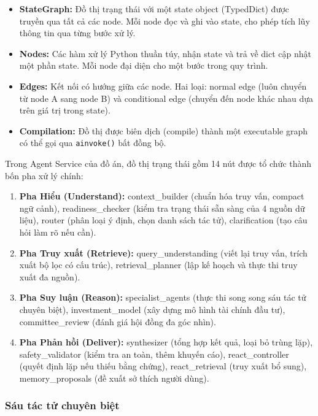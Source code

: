 \begin{itemize}
    \item \textbf{StateGraph:} Đồ thị trạng thái với một state object (TypedDict) được truyền qua tất cả các node. Mỗi node đọc và ghi vào state, cho phép tích lũy thông tin qua từng bước xử lý.
    \item \textbf{Nodes:} Các hàm xử lý Python thuần túy, nhận state và trả về dict cập nhật một phần state. Mỗi node đại diện cho một bước trong quy trình.
    \item \textbf{Edges:} Kết nối có hướng giữa các node. Hai loại: normal edge (luôn chuyển từ node A sang node B) và conditional edge (chuyển đến node khác nhau dựa trên giá trị trong state).
    \item \textbf{Compilation:} Đồ thị được biên dịch (compile) thành một executable graph có thể gọi qua \texttt{ainvoke()} bất đồng bộ.
\end{itemize}

Trong Agent Service của đồ án, đồ thị trạng thái gồm 14 nút được tổ chức thành bốn pha xử lý chính:

\begin{enumerate}
    \item \textbf{Pha Hiểu (Understand):} context\_builder (chuẩn hóa truy vấn, compact ngữ cảnh), readiness\_checker (kiểm tra trạng thái sẵn sàng của 4 nguồn dữ liệu), router (phân loại ý định, chọn danh sách tác tử), clarification (tạo câu hỏi làm rõ nếu cần).

    \item \textbf{Pha Truy xuất (Retrieve):} query\_understanding (viết lại truy vấn, trích xuất bộ lọc có cấu trúc), retrieval\_planner (lập kế hoạch và thực thi truy xuất đa nguồn).

    \item \textbf{Pha Suy luận (Reason):} specialist\_agents (thực thi song song sáu tác tử chuyên biệt), investment\_model (xây dựng mô hình tài chính đầu tư), committee\_review (đánh giá hội đồng đa góc nhìn).

    \item \textbf{Pha Phản hồi (Deliver):} synthesizer (tổng hợp kết quả, loại bỏ trùng lặp), safety\_validator (kiểm tra an toàn, thêm khuyến cáo), react\_controller (quyết định lặp nếu thiếu bằng chứng), react\_retrieval (truy xuất bổ sung), memory\_proposals (đề xuất sở thích người dùng).
\end{enumerate}

\subsubsection*{Sáu tác tử chuyên biệt}

